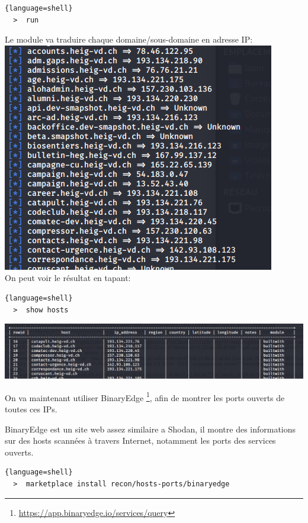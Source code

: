 \begin{lstlisting}{language=shell}
  >  run
\end{lstlisting}

Le module va traduire chaque domaine/sous-domaine en adresse IP: \\

\includegraphics[scale=0.48]{images/SEN_Projet_Image021.png} \\

On peut voir le résultat en tapant:

\begin{lstlisting}{language=shell}
  >  show hosts
\end{lstlisting}

\includegraphics[scale=0.48]{images/SEN_Projet_Image022.png}

On va maintenant utiliser BinaryEdge \footnote{\url{https://app.binaryedge.io/services/query}}, afin de montrer les ports ouverts de toutes ces IPs.

BinaryEdge est un site web assez similaire a Shodan, il montre des informations sur des hosts scannées à travers
Internet, notamment les ports des services ouverts.

\begin{lstlisting}{language=shell}
  >  marketplace install recon/hosts-ports/binaryedge
\end{lstlisting}

